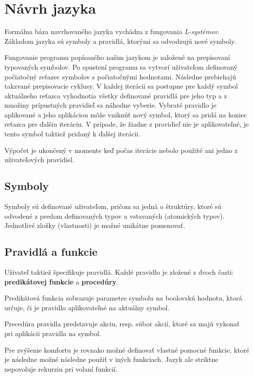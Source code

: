 \chapter{Návrh jazyka}

Formálna báza navrhovaného jazyka vychádza z fungovania \textit{L-systémov}.
Základom jazyka sú symboly a pravidlá, ktorými sa odvodzujú nové symboly.


Fungovanie programu popísaného našim jazykom je založené na prepisovaní typovaných symbolov.
Po spustení programu sa vytvorí uživateľom definovaný počiatočný reťazec symbolov s počiatočnými hodnotami.
Následne prebiehajú takzvané prepisovacie cyklusy. V každej iterácii sa postupne pre každý symbol aktuálneho reťazca
vyhodnotia všetky definované pravidlá pre jeho typ a z množiny prípustných pravidieľ sa náhodne vyberie.
Vybraté pravidlo je aplikované a jeho aplikáciou môže vniknúť nový symbol, ktorý sa pridá na koniec reťazca pre ďalšiu iteráciu.
V prípade, že žiadne z pravidieľ nie je aplikovateľné, je tento symbol taktiež pridaný k ďalšej iterácii.

Výpočet je ukončený v momente keď počas iterácie nebolo použité ani jedno z uživateľových pravidiel.

\section{Symboly}
Symboly sú definované uživateľom, pričom sa jedná o štruktúry, ktoré sú odvodené z predom definovaných
typov a vstavaných (atomických typov). Jednotlivé zložky (vlastnosti) je možné unikátne pomenovať.

\section{Pravidlá a funkcie}
Uživateľ taktiež špecifikuje pravidlá. Každé pravidlo je zložené z dvoch časti: \textbf{predikátovej funkcie} a \textbf{procedúry}.

Predikátová funkcia zobrazuje parametre symbolu na boolovskú hodnotu, ktorá určuje, či je pravidlo aplikovateľné na
aktuálny symbol. 

Precedúra pravidla predstavuje akciu, resp. súbor akcií, ktoré sa majú vykonať pri aplikácii pravidla na symbol. 

Pre zvýšenie komfortu je rovnako možné definovať vlastné pomocné funkcie, ktoré je následne možné následne použiť v iných funkciach. 
Jazyk ale striktne nepovoluje rekurziu pri volaní funkcií.

